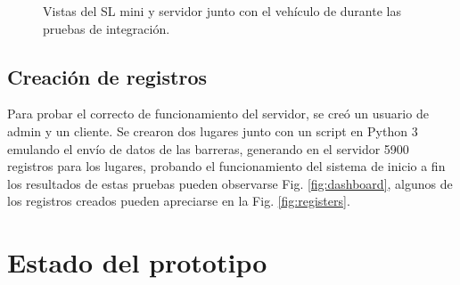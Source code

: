 \begin{figure}
    \caption{Vistas del SL mini y servidor junto con el vehículo de durante las pruebas de integración.}
    \label{fig:pruebas-integracion-sl-server}
\end{figure}


\subsection{Creación de registros}

Para probar el correcto de funcionamiento del servidor, se creó un usuario de admin y un cliente. Se crearon dos lugares junto con un script en Python 3 emulando el envío de datos de las barreras, generando en el servidor 5900 registros para los lugares, probando el funcionamiento del sistema de inicio a fin los resultados de estas pruebas pueden observarse Fig. \ref{fig:dashboard}, algunos de los registros creados pueden apreciarse en la Fig. \ref{fig:registers}.

\section{Estado del prototipo}

